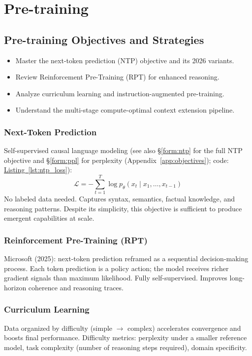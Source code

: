 \part{Pre-training}

\chapter{Pre-training Objectives and Strategies}
\minitoc

\begin{chapteroverview}
  \begin{itemize}
    \item Master the next-token prediction (NTP) objective and its 2026 variants.
    \item Review Reinforcement Pre-Training (RPT) for enhanced reasoning.
    \item Analyze curriculum learning and instruction-augmented pre-training.
    \item Understand the multi-stage compute-optimal context extension pipeline.
  \end{itemize}
\end{chapteroverview}

\section{Next-Token Prediction}
Self-supervised causal language modeling (see also \hyperref[form:ntp]{\S\ref*{form:ntp}} for the full NTP objective and \hyperref[form:ppl]{\S\ref*{form:ppl}} for perplexity (Appendix~\ref{app:objectives}); code: \hyperref[lst:ntp_loss]{Listing~\ref*{lst:ntp_loss}}):
\[
  \mathcal{L} = -\sum_{t=1}^{T} \log p_\theta(x_t \mid x_1, \ldots, x_{t-1})
\]
No labeled data needed. Captures syntax, semantics, factual knowledge, and reasoning patterns. Despite its simplicity, this objective is sufficient to produce emergent capabilities at scale.

\section{Reinforcement Pre-Training (RPT)}
Microsoft (2025): next-token prediction reframed as a sequential decision-making process. Each token prediction is a policy action; the model receives richer gradient signals than maximum likelihood. Fully self-supervised. Improves long-horizon coherence and reasoning traces.

\section{Curriculum Learning}
Data organized by difficulty (simple $\rightarrow$ complex) accelerates convergence and boosts final performance. Difficulty metrics: perplexity under a smaller reference model, task complexity (number of reasoning steps required), domain specificity.


